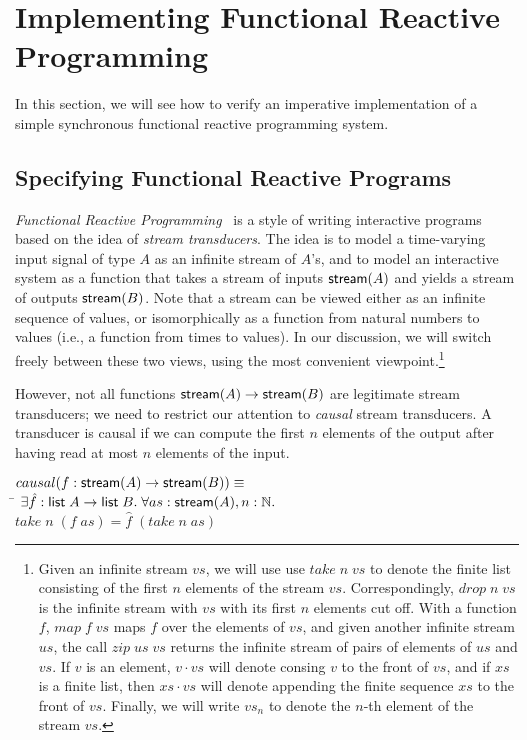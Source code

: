 \section{Implementing Functional Reactive Programming}

In this section, we will see how to verify an imperative
implementation of a simple synchronous functional reactive programming
system.

\subsection{Specifying Functional Reactive Programs}

\emph{Functional Reactive Programming}~\cite{frp} is a style of
writing interactive programs based on the idea of \emph{stream
  transducers}.  The idea is to model a time-varying input signal of
type $A$ as an infinite stream of $A$'s, and to model an interactive
system as a function that takes a stream of inputs $\mathsf{stream}({A})$ and
yields a stream of outputs $\mathsf{stream}({B})$. Note that a stream can be
viewed either as an infinite sequence of values, or isomorphically as
a function from natural numbers to values (i.e., a function from times
to values). In our discussion, we will switch freely between these two
views, using the most convenient viewpoint.\footnote{Given an infinite stream $vs$, we will use use $take\;n\;vs$ to denote
the finite list consisting of the first $n$ elements of the stream
$vs$. Correspondingly, $drop\;n\;vs$ is the infinite stream with $vs$
with its first $n$ elements cut off. With a function $f$, $map\;f\;vs$
maps $f$ over the elements of $vs$, and given another infinite stream
$us$, the call $zip\;us\;vs$ returns the infinite stream of pairs of
elements of $us$ and $vs$. If $v$ is an element, $v \cdot vs$ will 
denote consing $v$ to the front of $vs$, and if $xs$ is a finite list, then
$xs \cdot vs$ will denote appending the finite sequence $xs$ to the
front of $vs$. Finally, we will write $vs_n$ to denote the $n$-th element
of the stream $vs$.}

However, not all functions $\mathsf{stream}({A}) \to \mathsf{stream}({B})$ are legitimate
stream transducers; we need to restrict our attention to \emph{causal}
stream transducers. A transducer is causal if we can compute the first
$n$ elements of the output after having read at most $n$ elements of
the input. 

\begin{tabbing}
$causal(f : \mathsf{stream}({A}) \to \mathsf{stream}({B})) \equiv$ \\
\;\;\= $\exists \hat{f} : \mathsf{list}\;{A} \to \mathsf{list}\;{B}.\;\forall as:\mathsf{stream}({A}), n:\mathbb{N}.$ \\
    \> \;\;$take\;n\;(f\;as) = \hat{f}\;(take\;n\;as)$ 
\end{tabbing}

